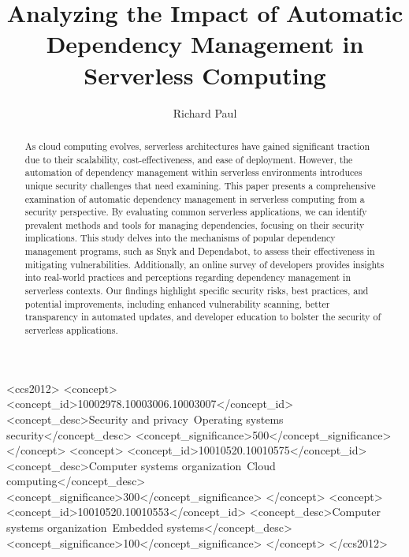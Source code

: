 \documentclass[sigconf]{acmart}
\begin{document}
\title{Analyzing the Impact of Automatic Dependency Management in Serverless Computing}
\author{Richard Paul}

\begin{abstract}
	As cloud computing evolves, serverless architectures have gained significant traction due to their scalability, cost-effectiveness, and ease of deployment. However, the automation of dependency management within serverless environments introduces unique security challenges that need examining. This paper presents a comprehensive examination of automatic dependency management in serverless computing from a security perspective. By evaluating common serverless applications, we can identify prevalent methods and tools for managing dependencies, focusing on their security implications. This study delves into the mechanisms of popular dependency management programs, such as Snyk and Dependabot, to assess their effectiveness in mitigating vulnerabilities. Additionally, an online survey of developers provides insights into real-world practices and perceptions regarding dependency management in serverless contexts. Our findings highlight specific security risks, best practices, and potential improvements, including enhanced vulnerability scanning, better transparency in automated updates, and developer education to bolster the security of serverless applications. 
\end{abstract}

\begin{CCSXML}
	<ccs2012>
	<concept>
	<concept_id>10002978.10003006.10003007</concept_id>
	<concept_desc>Security and privacy~Operating systems security</concept_desc>
	<concept_significance>500</concept_significance>
	</concept>
	<concept>
	<concept_id>10010520.10010575</concept_id>
	<concept_desc>Computer systems organization~Cloud computing</concept_desc>
	<concept_significance>300</concept_significance>
	</concept>
	<concept>
	<concept_id>10010520.10010553</concept_id>
	<concept_desc>Computer systems organization~Embedded systems</concept_desc>
	<concept_significance>100</concept_significance>
	</concept>
	</ccs2012>
\end{CCSXML}

\end{document}
